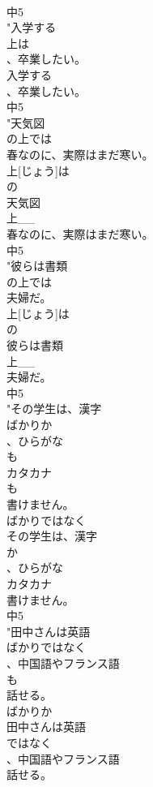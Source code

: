 \documentclass[8pt]{extreport}
\begin{document}
\begin{CJK}{UTF8}{min}
\\	中5
\\	"入学する
\\	上は
\\	、卒業したい。
\\	入学する
\\	、卒業したい。
\\	中5
\\	"天気図
\\	の上では
\\	春なのに、実際はまだ寒い。
\\	上[じょう]は
\\	の
\\	天気図
\\	上__
\\	春なのに、実際はまだ寒い。
\\	中5
\\	"彼らは書類
\\	の上では
\\	夫婦だ。
\\	上[じょう]は
\\	の
\\	彼らは書類
\\	上__
\\	夫婦だ。
\\	中5
\\	"その学生は、漢字
\\	ばかりか
\\	、ひらがな
\\	も
\\	カタカナ
\\	も
\\	書けません。
\\	ばかりではなく
\\	その学生は、漢字
\\	か
\\	、ひらがな
\\	カタカナ
\\	書けません。
\\	中5
\\	"田中さんは英語
\\	ばかりではなく
\\	、中国語やフランス語
\\	も
\\	話せる。
\\	ばかりか
\\	田中さんは英語
\\	ではなく
\\	、中国語やフランス語
\\	話せる。

\end{CJK}
\end{document}
